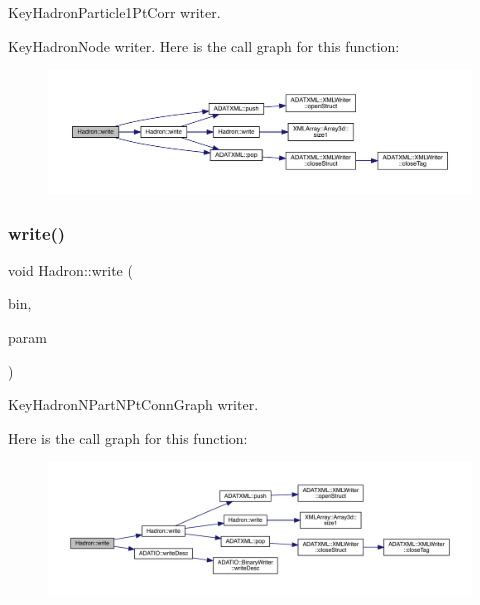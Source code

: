 Key\+Hadron\+Particle1\+Pt\+Corr writer. 

Key\+Hadron\+Node writer. Here is the call graph for this function\+:\nopagebreak
\begin{figure}[H]
\begin{center}
\leavevmode
\includegraphics[width=350pt]{d1/daf/namespaceHadron_ab67658d0abad845f6efa3ba94de7692c_cgraph}
\end{center}
\end{figure}
\mbox{\label{namespaceHadron_a0a1d03111d7a7c9ff16ee1baf1928652}} 
\subsubsection{\texorpdfstring{write()}{write()}\hspace{0.1cm}{\footnotesize\ttfamily [77/95]}}
{\footnotesize\ttfamily void Hadron\+::write (\begin{DoxyParamCaption}\item[{\mbox{\hyperlink{classADATIO_1_1BinaryWriter}{Binary\+Writer}} \&}]{bin,  }\item[{const \mbox{\hyperlink{structHadron_1_1KeyHadronNPartNPtConnGraph__t}{Key\+Hadron\+N\+Part\+N\+Pt\+Conn\+Graph\+\_\+t}} \&}]{param }\end{DoxyParamCaption})}



Key\+Hadron\+N\+Part\+N\+Pt\+Conn\+Graph writer. 

Here is the call graph for this function\+:\nopagebreak
\begin{figure}[H]
\begin{center}
\leavevmode
\includegraphics[width=350pt]{d1/daf/namespaceHadron_a0a1d03111d7a7c9ff16ee1baf1928652_cgraph}
\end{center}
\end{figure}
\mbox{\label{namespaceHadron_ad5c8dc860360f98655b29f17b61f2a35}} 

